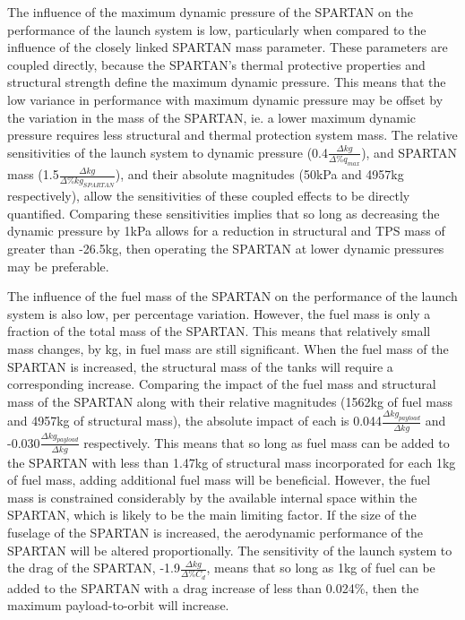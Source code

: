The influence of the maximum dynamic pressure of the SPARTAN on the performance of the launch system is low, particularly when compared to the influence of the closely linked SPARTAN mass parameter. These parameters are coupled directly, because the SPARTAN's thermal protective properties and structural strength define the maximum dynamic pressure. This means that the low variance in performance with maximum dynamic pressure may be offset by the variation in the mass of the SPARTAN, ie. a lower maximum dynamic pressure requires less structural and thermal protection system mass.
The relative sensitivities of the launch system to dynamic pressure (0.4$\frac{\Delta kg}{\Delta\%q_{max}}$), and SPARTAN mass (1.5$\frac{\Delta kg}{\Delta\%kg_{SPARTAN}}$), and their absolute magnitudes (50kPa and 4957kg respectively), allow the sensitivities of these coupled effects to be directly quantified. Comparing these sensitivities implies that so long as decreasing the dynamic pressure by 1kPa allows for a reduction in structural and TPS mass of greater than -26.5kg, then operating the SPARTAN at lower dynamic pressures may be preferable. 

The influence of the fuel mass of the SPARTAN on the performance of the launch system is also low, per percentage variation. However, the fuel mass is only a fraction of the total mass of the SPARTAN. This means that relatively small mass changes, by kg, in fuel mass are still significant. 
When the fuel mass of the SPARTAN is increased, the structural mass of the tanks will require a corresponding increase. 
Comparing the impact of the fuel mass and structural mass of the SPARTAN along with their relative magnitudes (1562kg of fuel mass and 4957kg of structural mass), the absolute impact of each is 0.044$\frac{\Delta kg_{payload}}{\Delta kg}$ and -0.030$\frac{\Delta kg_{payload}}{\Delta kg}$ respectively. This means that so long as fuel mass can be added to the SPARTAN with less than 1.47kg of structural mass incorporated for each 1kg of fuel mass, adding additional fuel mass will be beneficial. However, the fuel mass is constrained considerably by the available internal space within the SPARTAN, which is likely to be the main limiting factor.
If the size of the fuselage of the SPARTAN is increased, the aerodynamic performance of the SPARTAN will be altered proportionally. 
The sensitivity of the launch system to the drag of the SPARTAN, -1.9$\frac{\Delta kg}{\Delta\%C_{d}}$, means that so long as 1kg of fuel can be added to the SPARTAN with a drag increase of less than 0.024\%, then the maximum payload-to-orbit will increase. 


